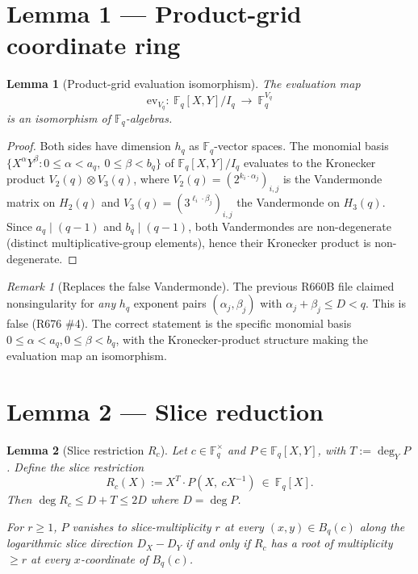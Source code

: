 \documentclass[12pt]{amsart}
\newtheorem{lemma}{Lemma}
\theoremstyle{definition}
\theoremstyle{remark}
\newtheorem{remark}{Remark}
\begin{document}
\section{Lemma 1 --- Product-grid coordinate ring}

\begin{lemma}[Product-grid evaluation isomorphism]\label{lem:1}
The evaluation map
$$
\mathrm{ev}_{V_q} :\ \mathbb{F}_q[X, Y] / I_q\ \longrightarrow\ \mathbb{F}_q^{V_q}
$$
is an isomorphism of $\mathbb{F}_q$-algebras.
\end{lemma}

\begin{proof}
Both sides have dimension $h_q$ as $\mathbb{F}_q$-vector spaces.
The monomial basis $\{X^\alpha Y^\beta : 0 \le \alpha < a_q,\ 0 \le \beta < b_q\}$
of $\mathbb{F}_q[X, Y] / I_q$ evaluates to the Kronecker product
$V_2(q) \otimes V_3(q)$, where $V_2(q) = (2^{k_i \cdot \alpha_j})_{i, j}$ is the
Vandermonde matrix on $H_2(q)$ and $V_3(q) = (3^{\ell_i \cdot \beta_j})_{i, j}$
the Vandermonde on $H_3(q)$. Since $a_q \mid (q - 1)$ and $b_q \mid (q - 1)$,
both Vandermondes are non-degenerate (distinct multiplicative-group elements),
hence their Kronecker product is non-degenerate.
\end{proof}

\begin{remark}[Replaces the false Vandermonde]
The previous R660B file claimed nonsingularity for \emph{any} $h_q$ exponent
pairs $(\alpha_j, \beta_j)$ with $\alpha_j + \beta_j \le D < q$. This is false
(R676 \#4). The correct statement is the specific monomial basis
$0 \le \alpha < a_q, 0 \le \beta < b_q$, with the Kronecker-product structure
making the evaluation map an isomorphism.
\end{remark}

\section{Lemma 2 --- Slice reduction}

\begin{lemma}[Slice restriction $R_c$]\label{lem:2}
Let $c \in \mathbb{F}_q^\times$ and $P \in \mathbb{F}_q[X, Y]$, with
$T := \deg_Y P$. Define the \emph{slice restriction}
$$
R_c(X) := X^T \cdot P(X,\ c X^{-1})\ \in\ \mathbb{F}_q[X].
$$
Then $\deg R_c \le D + T \le 2 D$ where $D = \deg P$.

For $r \ge 1$, $P$ vanishes to slice-multiplicity $r$ at every $(x, y) \in B_q(c)$
along the logarithmic slice direction $D_X - D_Y$ if and only if $R_c$ has
a root of multiplicity $\ge r$ at every $x$-coordinate of $B_q(c)$.
\end{lemma}
\end{document}
